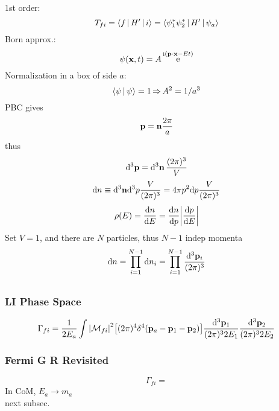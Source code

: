 \documentclass[a4paper]{article}
\DeclareMathOperator{\e}{\mathrm{e}}
\DeclareMathOperator{\I}{\mathrm{i}}
\DeclareMathOperator{\ra}{\rightarrow}
\DeclareMathOperator{\dra}{\Rightarrow}
\numberwithin{equation}{section}
\begin{document}
1st order:
\begin{equation}\label{key}
T_{fi} = \Braket{f | H' | i} = \Braket{\psi_1^*\psi_2^* | H' | \psi_a}
\end{equation}
Born approx.:
\begin{equation}\label{key}
\psi(\vb{x}, t) = A\e^{\I(\vb{p}\cdot\vb{x} - Et)}
\end{equation}
Normalization in a box of side $ a $:
\begin{equation}\label{key}
\Braket{\psi | \psi} = 1 \dra A^2 = 1/a^3
\end{equation}
PBC gives
\begin{equation}\label{key}
\vb{p} = \vb{n}\dfrac{2\pi}{a}
\end{equation}
thus
\begin{equation}\label{key}
\dd[3]{\vb{p}} = \dd[3]{\vb{n}}\dfrac{(2\pi)^3}{V}
\end{equation}
\begin{equation}\label{key}
\dd n \equiv \dd[3]\vb{n} \dd[3] p \dfrac{V}{(2\pi)^3} = 4\pi p^2\dd p \dfrac{V}{(2\pi)^3}
\end{equation}
\begin{equation}\label{key}
\rho(E) = \dv{n}{E} = \dv{n}{p}\abs{\dv{p}{E}}
\end{equation}
Set $ V = 1 $, and there are $ N $ particles, thus $ N - 1 $ indep momenta
\begin{equation}\label{key}
\dd n = \prod_{i=1}^{N-1}\dd n_i = \prod_{i=1}^{N-1} \dfrac{\dd[3]\vb{p}_i}{(2\pi)^3}
\end{equation}
\begin{equation}\label{key}
~
\end{equation}

\subsubsection{LI Phase Space}
\begin{equation}\label{key}
\Gamma_{fi} = \dfrac{1}{2E_a} \int \abs{\mathcal{M}_{fi}}^2\qty[(2\pi)^4\delta^4(\vb{p}_a - \vb{p}_1 - \vb{p}_2)] \dfrac{\dd[3]\vb{p}_1}{(2\pi)^3 2E_1} \dfrac{\dd[3]\vb{p}_2}{(2\pi)^3 2E_2}
\end{equation}

\subsubsection{Fermi G R Revisited}
\begin{equation}\label{key}
\Gamma_{fi} = 
\end{equation}
In CoM, $ E_a \ra m_a $\\
next subsec.
\end{document}
